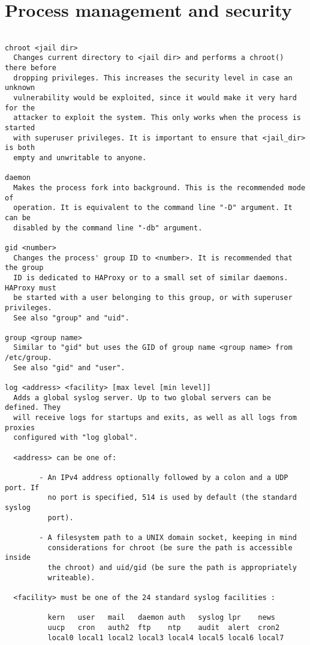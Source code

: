 
\section{Process management and security}

\begin{verbatim}

chroot <jail dir>
  Changes current directory to <jail dir> and performs a chroot() there before
  dropping privileges. This increases the security level in case an unknown
  vulnerability would be exploited, since it would make it very hard for the
  attacker to exploit the system. This only works when the process is started
  with superuser privileges. It is important to ensure that <jail_dir> is both
  empty and unwritable to anyone.

daemon
  Makes the process fork into background. This is the recommended mode of
  operation. It is equivalent to the command line "-D" argument. It can be
  disabled by the command line "-db" argument.

gid <number>
  Changes the process' group ID to <number>. It is recommended that the group
  ID is dedicated to HAProxy or to a small set of similar daemons. HAProxy must
  be started with a user belonging to this group, or with superuser privileges.
  See also "group" and "uid".

group <group name>
  Similar to "gid" but uses the GID of group name <group name> from /etc/group.
  See also "gid" and "user".

log <address> <facility> [max level [min level]]
  Adds a global syslog server. Up to two global servers can be defined. They
  will receive logs for startups and exits, as well as all logs from proxies
  configured with "log global".

  <address> can be one of:

        - An IPv4 address optionally followed by a colon and a UDP port. If
          no port is specified, 514 is used by default (the standard syslog
          port).

        - A filesystem path to a UNIX domain socket, keeping in mind
          considerations for chroot (be sure the path is accessible inside
          the chroot) and uid/gid (be sure the path is appropriately
          writeable).

  <facility> must be one of the 24 standard syslog facilities :

          kern   user   mail   daemon auth   syslog lpr    news
          uucp   cron   auth2  ftp    ntp    audit  alert  cron2
          local0 local1 local2 local3 local4 local5 local6 local7


\end{verbatim}
